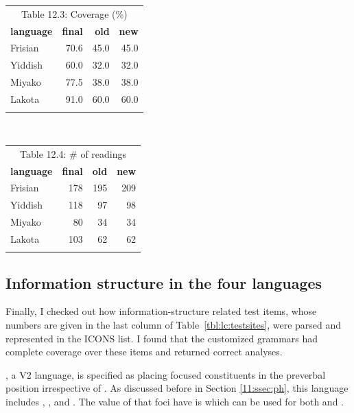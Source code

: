 \begin{table}[!t]
\small
\centering
\begin{tabular}{lrrr}
\multicolumn{4}{c}{Table 12.3: Coverage (\%)}\\
\lsptoprule
\textbf{language} & \textbf{final} & \textbf{old}  & \textbf{new} \\ \hline
\midrule
Frisian  & 70.6 &  45.0 &  45.0 \\
Yiddish  & 60.0 &  32.0 &  32.0 \\
Miyako  & 77.5 &  38.0 &  38.0 \\
Lakota  & 91.0 &  60.0 &  60.0 \\
\lspbottomrule
\end{tabular}
\mbox{ }  \mbox{ } \mbox{ }  \mbox{ } \mbox{ }  
\begin{tabular}{lrrr}
\multicolumn{4}{c}{Table 12.4: \# of readings}\\
\lsptoprule
\textbf{language} & \textbf{final} & \textbf{old}  & \textbf{new} \\ \hline
\midrule
Frisian  & 178 &  195 &  209 \\
Yiddish  & 118 &  97 &  98 \\
Miyako  & 80 &  34 &  34 \\
Lakota  & 103 & 62 &  62 \\
\lspbottomrule
\end{tabular}
\end{table}



\subsection{Information structure in the four languages}
\label{13:ssec:lc-info}


Finally, I checked out how information-structure related test items,
whose numbers are given in the last column of
Table~\ref{tbl:lc:testsites}, were parsed and represented in the ICONS
list.  I found that the customized grammars had complete
coverage over these items and returned correct analyses.



, a V2 language, is specified as placing focused constituents
in the preverbal position irrespective of .  As
discussed before in Section \ref{11:ssec:ph}, this language includes
, , and
. The value of  that
 foci have is  which can be used for both
 and .


